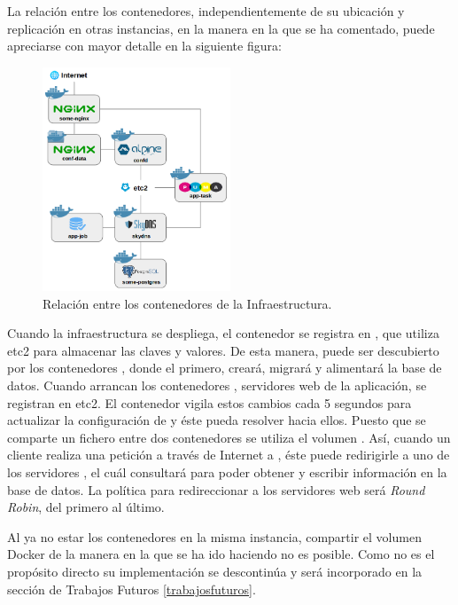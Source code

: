 La relación entre los contenedores, independientemente de su ubicación y replicación en otras instancias, en la manera en la que se ha comentado, puede apreciarse con mayor detalle en la siguiente figura:

\begin{figure}[H]
\centering
\includegraphics[width=0.5\textwidth]{images/figures/aws-2-iteration.png}
\caption{Relación entre los contenedores de la Infraestructura.}
\end{figure}

Cuando la infraestructura se despliega, el contenedor  se registra en , que utiliza etc2 para almacenar las claves y valores. De esta manera,  puede ser descubierto por los contenedores , donde el primero, creará, migrará y alimentará la base de datos. Cuando arrancan los contenedores , servidores web de la aplicación, se registran en etc2. El contenedor  vigila estos cambios cada 5 segundos para actualizar la configuración de  y éste pueda resolver hacia ellos. Puesto que se comparte un fichero entre dos contenedores se utiliza el volumen . Así, cuando un cliente realiza una petición a través de Internet a , éste puede redirigirle a uno de los servidores , el cuál consultará  para poder obtener y escribir información en la base de datos. La política para redireccionar a los servidores web será \textit{Round Robin}, del primero al último.

Al ya no estar los contenedores en la misma instancia, compartir el volumen Docker  de la manera en la que se ha ido haciendo no es posible. Como no es el propósito directo su implementación se descontinúa y será incorporado en la sección de Trabajos Futuros \ref{trabajosfuturos}.

